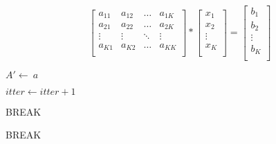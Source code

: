 \documentclass[a4paper,12pt]{article}
\begin{document}
\begin{equation}
\label{eg:array}
\left[ \begin{array}{cccc}
a_{11} & a_{12} & \ldots & a_{1K} \\
a_{21} & a_{22} & \ldots & a_{2K} \\
\vdots & \vdots & \ddots & \vdots \\
a_{K1} & a_{K2} & \ldots & a_{KK} \\
\end{array} \right]*
\left[ \begin{array}{c}
x_{1} \\
x_{2} \\
\vdots \\
x_{K} \\
\end{array} \right]=
\left[ \begin{array}{c}
b_{1} \\
b_{2} \\
\vdots \\
b_{K} \\
\end{array} \right]
\end{equation}

\begin{algorithmic}
\item {$A' \leftarrow \ a$}
\item {$itter \leftarrow itter+1$}
\item {BREAK}
\ENDIF
\ENDIF
\ENDFOR
{}
\item{BREAK}
\ENDIF
\ENDFOR
{}
\end{algorithmic}
\end{document}
